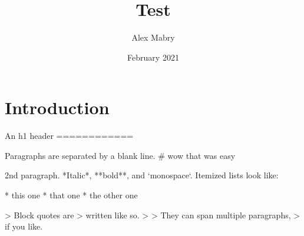 \documentclass{article}
\title{Test}
\author{Alex Mabry}
\date{February 2021}
\begin{document}
\maketitle


\section{Introduction}

\begin{markdown}
An h1 header
============

Paragraphs are separated by a blank line. 
# wow that was easy

2nd paragraph. *Italic*, **bold**, and `monospace`. Itemized lists
look like:

* this one
* that one
* the other one

> Block quotes are
> written like so.
>
> They can span multiple paragraphs,
> if you like.

\end{markdown}
\end{document}
